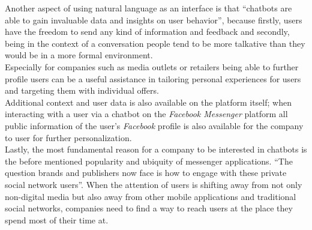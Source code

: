 Another aspect of using natural language as an interface is that ``chatbots are able to gain invaluable data and insights on user behavior''\cite{drum},
because firstly, users have the freedom to send any kind of information and feedback and
secondly, being in the context of a conversation people tend to be more talkative than they would be in a more formal environment.
\\
Especially for companies such as media outlets or retailers being able to further profile users can be a useful assistance in tailoring personal experiences for users and targeting them with individual offers.
\\
Additional context and user data is also available on the platform itself;
when interacting with a user via a chatbot on the \emph{Facebook Messenger} platform all public information of the user's \emph{Facebook} profile is also available for the company to user for further personalization.
\\

Lastly, the most fundamental reason for a company to be interested in chatbots is the before mentioned popularity and ubiquity of messenger applications.
``The question brands and publishers now face is how to engage with these private social network users''\cite{drum}.
When the attention of users is shifting away from not only non-digital media but also away from other mobile applications
and traditional social networks, companies need to find a way to reach users at the place they spend most of their time at.
